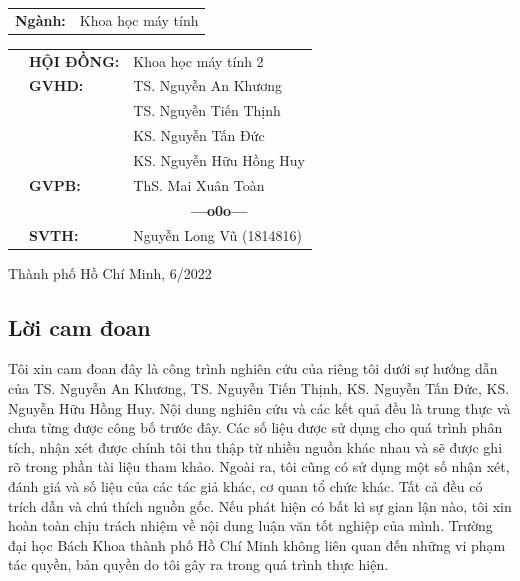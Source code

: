 \documentclass[a4paper, oneside, 13pt]{book}
\newcommand{\setupfont}[1]{\fontsize{#1}{#1}\selectfont}
\begin{document}
\begin{titlepage}
\vspace{0.2cm}

\begin{center}
	\setupfont{14pt}
	\begin{tabular}{rl}
		\textbf{Ngành:} & Khoa học máy tính
	\end{tabular}
\end{center}

\vspace{1.5cm}

\begin{table}[h]
	\setupfont{13pt}
\begin{tabular}{rll}
\hspace{5 cm}	& \textbf{HỘI ĐỒNG:} 	& Khoa học máy tính 2 \\
				& \textbf{GVHD:} 		& TS. Nguyễn An Khương\\
				&						& TS. Nguyễn Tiến Thịnh\\
				&						& KS. Nguyễn Tấn Đức\\
				&						& KS. Nguyễn Hữu Hồng Huy\\
				& \textbf{GVPB:}		& ThS. Mai Xuân Toàn \vspace{2mm}\\
				&&\multicolumn{1}{c}{\bf---o0o---}\vspace{2mm}\\
				& \textbf{SVTH:} 		& Nguyễn Long Vũ (1814816)
\end{tabular}
\end{table}

\begin{center}
{\setupfont{12pt} Thành phố Hồ Chí Minh, 6/2022}
\end{center}
\end{titlepage}

\setupfont{13pt}
\pagestyle{plain}

\cleardoublepage

\setlength{\parskip}{2.5mm}
\thispagestyle{plain}
	\begin{center}
		\section*{Lời cam đoan}
	\end{center}
	
	Tôi xin cam đoan đây là công trình nghiên cứu của riêng tôi dưới sự hướng dẫn của TS. Nguyễn An Khương, TS. Nguyễn Tiến Thịnh, KS. Nguyễn Tấn Đức, KS. Nguyễn Hữu Hồng Huy. Nội dung nghiên cứu và các kết quả đều là trung thực và chưa từng được công bố trước đây. Các số liệu được sử dụng cho quá trình phân tích, nhận xét được chính tôi thu thập từ nhiều nguồn khác nhau và sẽ được ghi rõ trong phần tài liệu tham khảo. Ngoài ra, tôi cũng có sử dụng một số nhận xét, đánh giá và số liệu của các tác giả khác, cơ quan tổ chức khác. Tất cả đều có trích dẫn và chú thích nguồn gốc. Nếu phát hiện có bất kì sự gian lận nào, tôi xin hoàn toàn chịu trách nhiệm về nội dung luận văn tốt nghiệp của mình. Trường đại học Bách Khoa thành phố Hồ Chí Minh không liên quan đến những vi phạm tác quyền, bản quyền do tôi gây ra trong quá trình thực hiện.
	
\end{document}
